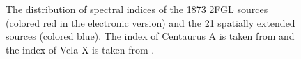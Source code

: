 \documentclass[12pt,preprint]{aastex}
\newif\ifcolorfigure
\begin{document}
\clearpage
\begin{figure}
    \ifcolorfigure
      \plotone{summary_plots/compare_index_2FGL_color.eps}
    \else
    \fi
    \caption{
    The distribution of spectral indices of the 1873 2FGL sources
    (colored red in the electronic version) and the 21 spatially extended
    sources (colored blue).  The index of Centaurus A is taken from
    \cite{second_cat} and the index of Vela X is taken from \cite{velax}.
    }\label{compare_index_2FGL}
  \end{figure}
\end{document}
